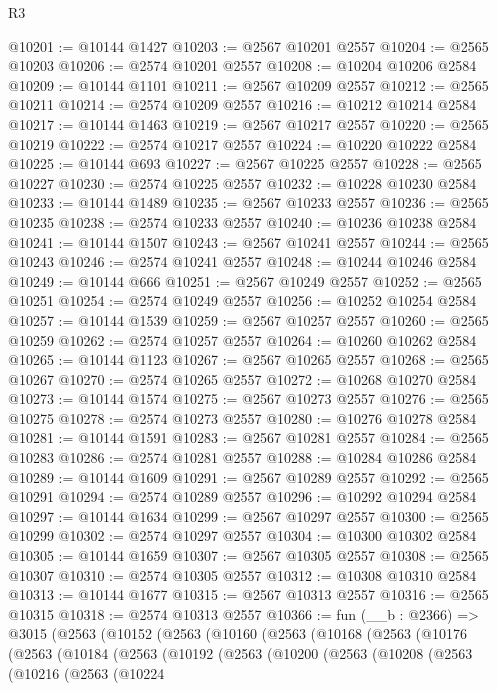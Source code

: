 \begin{lexlean}{R3}
\begin{coremodule}
@10201 := @10144 @1427
@10203 := @2567 @10201 @2557
@10204 := @2565 @10203
@10206 := @2574 @10201 @2557
@10208 := @10204 @10206 @2584
@10209 := @10144 @1101
@10211 := @2567 @10209 @2557
@10212 := @2565 @10211
@10214 := @2574 @10209 @2557
@10216 := @10212 @10214 @2584
@10217 := @10144 @1463
@10219 := @2567 @10217 @2557
@10220 := @2565 @10219
@10222 := @2574 @10217 @2557
@10224 := @10220 @10222 @2584
@10225 := @10144 @693
@10227 := @2567 @10225 @2557
@10228 := @2565 @10227
@10230 := @2574 @10225 @2557
@10232 := @10228 @10230 @2584
@10233 := @10144 @1489
@10235 := @2567 @10233 @2557
@10236 := @2565 @10235
@10238 := @2574 @10233 @2557
@10240 := @10236 @10238 @2584
@10241 := @10144 @1507
@10243 := @2567 @10241 @2557
@10244 := @2565 @10243
@10246 := @2574 @10241 @2557
@10248 := @10244 @10246 @2584
@10249 := @10144 @666
@10251 := @2567 @10249 @2557
@10252 := @2565 @10251
@10254 := @2574 @10249 @2557
@10256 := @10252 @10254 @2584
@10257 := @10144 @1539
@10259 := @2567 @10257 @2557
@10260 := @2565 @10259
@10262 := @2574 @10257 @2557
@10264 := @10260 @10262 @2584
@10265 := @10144 @1123
@10267 := @2567 @10265 @2557
@10268 := @2565 @10267
@10270 := @2574 @10265 @2557
@10272 := @10268 @10270 @2584
@10273 := @10144 @1574
@10275 := @2567 @10273 @2557
@10276 := @2565 @10275
@10278 := @2574 @10273 @2557
@10280 := @10276 @10278 @2584
@10281 := @10144 @1591
@10283 := @2567 @10281 @2557
@10284 := @2565 @10283
@10286 := @2574 @10281 @2557
@10288 := @10284 @10286 @2584
@10289 := @10144 @1609
@10291 := @2567 @10289 @2557
@10292 := @2565 @10291
@10294 := @2574 @10289 @2557
@10296 := @10292 @10294 @2584
@10297 := @10144 @1634
@10299 := @2567 @10297 @2557
@10300 := @2565 @10299
@10302 := @2574 @10297 @2557
@10304 := @10300 @10302 @2584
@10305 := @10144 @1659
@10307 := @2567 @10305 @2557
@10308 := @2565 @10307
@10310 := @2574 @10305 @2557
@10312 := @10308 @10310 @2584
@10313 := @10144 @1677
@10315 := @2567 @10313 @2557
@10316 := @2565 @10315
@10318 := @2574 @10313 @2557
@10366 := fun (__b : @2366) =>
  @3015
    (@2563
      (@10152
        (@2563
          (@10160
            (@2563
              (@10168
                (@2563
                  (@10176
                    (@2563
                      (@10184
                        (@2563
                          (@10192
                            (@2563
                              (@10200
                                (@2563
                                  (@10208
                                    (@2563
                                      (@10216
                                        (@2563
                                          (@10224

\end{coremodule}
\end{lexlean}
